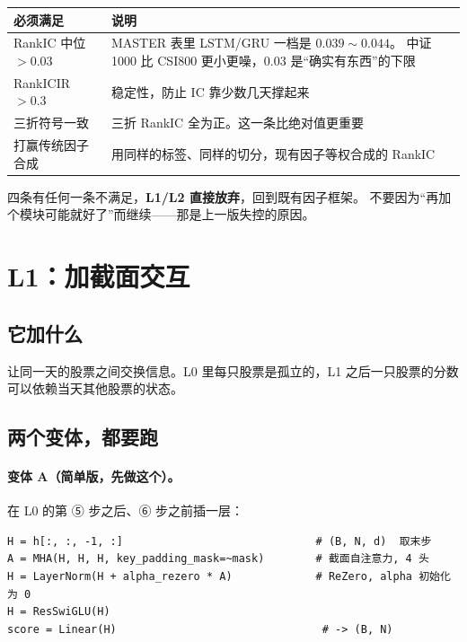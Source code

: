 \documentclass[11pt, a4paper]{ctexart}
\begin{document}
\begin{center}
\small
\begin{tabular}{lp{9.5cm}}
\toprule
必须满足 & 说明 \\
\midrule
RankIC 中位 $> 0.03$ & MASTER 表里 LSTM/GRU 一档是 $0.039\sim0.044$。
  中证1000 比 CSI800 更小更噪，$0.03$ 是“确实有东西”的下限 \\
RankICIR $> 0.3$ & 稳定性，防止 IC 靠少数几天撑起来 \\
三折符号一致 & 三折 RankIC 全为正。这一条比绝对值更重要 \\
打赢传统因子合成 & 用同样的标签、同样的切分，现有因子等权合成的 RankIC \\
\bottomrule
\end{tabular}
\end{center}

\begin{warnbox}
四条有任何一条不满足，\textbf{L1/L2 直接放弃}，回到既有因子框架。
不要因为“再加个模块可能就好了”而继续——那是上一版失控的原因。
\end{warnbox}

\section{L1：加截面交互}

\subsection{它加什么}
让同一天的股票之间交换信息。L0 里每只股票是孤立的，L1 之后一只股票的分数
可以依赖当天其他股票的状态。

\subsection{两个变体，都要跑}

\paragraph{变体 A（简单版，先做这个）。}在 L0 的第 ⑤ 步之后、⑥ 步之前插一层：

\begin{lstlisting}
H = h[:, :, -1, :]                              # (B, N, d)  取末步
A = MHA(H, H, H, key_padding_mask=~mask)        # 截面自注意力, 4 头
H = LayerNorm(H + alpha_rezero * A)             # ReZero, alpha 初始化为 0
H = ResSwiGLU(H)
score = Linear(H)                                # -> (B, N)
\end{lstlisting}
\end{document}
